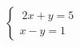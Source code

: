 \documentclass[preview]{standalone}
\begin{document}
\begin{align*}
\left\{ \begin{array}{cl} \ 2x + y  =  5 \\[1pt] x - y  =  1 \end{array} \right.
\end{align*}
\end{document}
